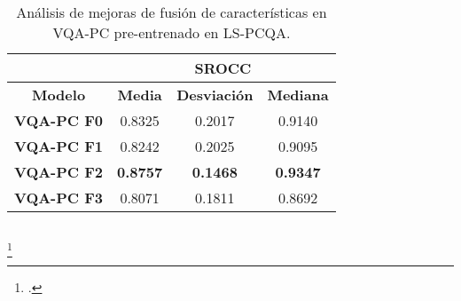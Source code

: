 \begin{frame}
\begin{columns}
\begin{table}[htp]
  \scriptsize 
  \centering
\begin{tabular}{|c|c|c|c|}
\hline
\rowcolor[HTML]{FFC702}
                       & \multicolumn{3}{c|}{\textbf{SROCC}}                                                                                                          \\ \hline
\rowcolor[HTML]{FFC702}
\textbf{Modelo}    & \textbf{Media} & \textbf{Desviación} & \textbf{Mediana} \\ \hline
\textbf{VQA-PC F0} & 0.8325           & 0.2017              & 0.9140           \\ \hline
\textbf{VQA-PC F1} & 0.8242           & 0.2025              & 0.9095           \\ \hline
\textbf{VQA-PC F2} & \textbf{0.8757}  & \textbf{0.1468}     & \textbf{0.9347}  \\ \hline
\textbf{VQA-PC F3} & 0.8071           & 0.1811              & 0.8692           \\ \hline
\end{tabular}
\caption[Análisis de mejoras de fusión de características en VQA-PC pre-entrenado.]{
  Análisis de mejoras de fusión de características en VQA-PC pre-entrenado en LS-PCQA.
}\label{tab:VQAFromLSPCQA}
\end{table}

  \end{columns}
  \vspace{-.1cm}
  \footcitetext{EnsemblePCQA}
\end{frame}
